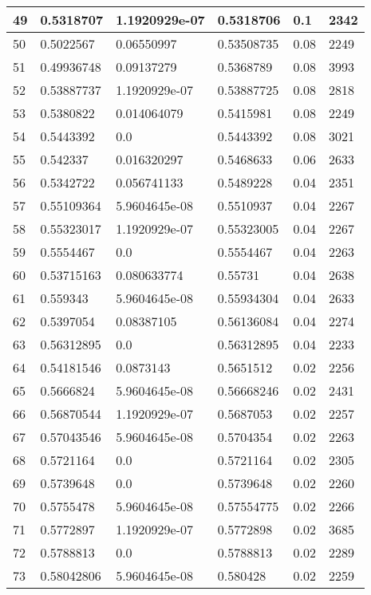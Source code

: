\begin{longtable}{|l|l|l|l|l|l|}
49 & 0.5318707 & 1.1920929e-07 & 0.5318706 & 0.1 & 2342 \\ \hline 
50 & 0.5022567 & 0.06550997 & 0.53508735 & 0.08 & 2249 \\ \hline 
51 & 0.49936748 & 0.09137279 & 0.5368789 & 0.08 & 3993 \\ \hline 
52 & 0.53887737 & 1.1920929e-07 & 0.53887725 & 0.08 & 2818 \\ \hline 
53 & 0.5380822 & 0.014064079 & 0.5415981 & 0.08 & 2249 \\ \hline 
54 & 0.5443392 & 0.0 & 0.5443392 & 0.08 & 3021 \\ \hline 
55 & 0.542337 & 0.016320297 & 0.5468633 & 0.06 & 2633 \\ \hline 
56 & 0.5342722 & 0.056741133 & 0.5489228 & 0.04 & 2351 \\ \hline 
57 & 0.55109364 & 5.9604645e-08 & 0.5510937 & 0.04 & 2267 \\ \hline 
58 & 0.55323017 & 1.1920929e-07 & 0.55323005 & 0.04 & 2267 \\ \hline 
59 & 0.5554467 & 0.0 & 0.5554467 & 0.04 & 2263 \\ \hline 
60 & 0.53715163 & 0.080633774 & 0.55731 & 0.04 & 2638 \\ \hline 
61 & 0.559343 & 5.9604645e-08 & 0.55934304 & 0.04 & 2633 \\ \hline 
62 & 0.5397054 & 0.08387105 & 0.56136084 & 0.04 & 2274 \\ \hline 
63 & 0.56312895 & 0.0 & 0.56312895 & 0.04 & 2233 \\ \hline 
64 & 0.54181546 & 0.0873143 & 0.5651512 & 0.02 & 2256 \\ \hline 
65 & 0.5666824 & 5.9604645e-08 & 0.56668246 & 0.02 & 2431 \\ \hline 
66 & 0.56870544 & 1.1920929e-07 & 0.5687053 & 0.02 & 2257 \\ \hline 
67 & 0.57043546 & 5.9604645e-08 & 0.5704354 & 0.02 & 2263 \\ \hline 
68 & 0.5721164 & 0.0 & 0.5721164 & 0.02 & 2305 \\ \hline 
69 & 0.5739648 & 0.0 & 0.5739648 & 0.02 & 2260 \\ \hline 
70 & 0.5755478 & 5.9604645e-08 & 0.57554775 & 0.02 & 2266 \\ \hline 
71 & 0.5772897 & 1.1920929e-07 & 0.5772898 & 0.02 & 3685 \\ \hline 
72 & 0.5788813 & 0.0 & 0.5788813 & 0.02 & 2289 \\ \hline 
73 & 0.58042806 & 5.9604645e-08 & 0.580428 & 0.02 & 2259 \\ \hline 

\end{longtable}
